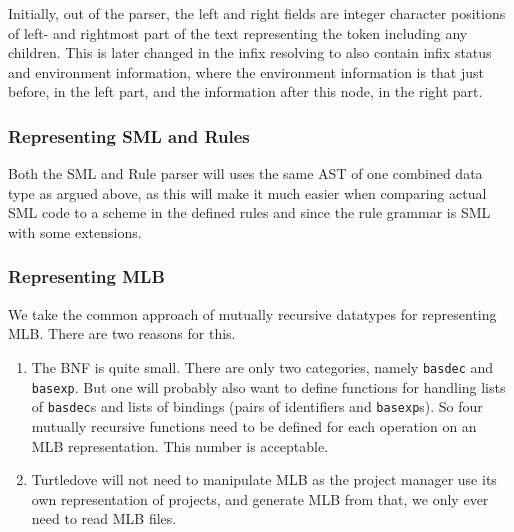 Initially, out of the parser, the left and right fields are integer character
positions of left- and rightmost part of the text representing the token
including any children. This is later changed in the infix resolving to also
contain infix status and environment information, where the environment
information is that just before, in the left part, and the information after
this node, in the right part.

\subsubsection{Representing SML and Rules}
Both the SML and Rule parser will uses the same AST of one combined data type as
argued above, as this will make it much easier
when comparing actual SML code to a scheme in the defined rules and since the
rule grammar is SML with some extensions.

\subsubsection{Representing MLB}

We take the common approach of mutually recursive datatypes for representing
MLB. There are two reasons for this.

\begin{enumerate}
\item The BNF is quite small. There are only two categories, namely
  \texttt{basdec} and \texttt{basexp}. But one will probably also want to define
  functions for handling lists of \texttt{basdec}s and lists of bindings (pairs
  of identifiers and \texttt{basexp}s). So four mutually recursive functions
  need to be defined for each operation on an MLB representation. This number is
  acceptable.
\item Turtledove will not need to manipulate MLB as the project manager use its
  own representation of projects, and generate MLB from that, we only ever need
  to read MLB files.
\end{enumerate}


